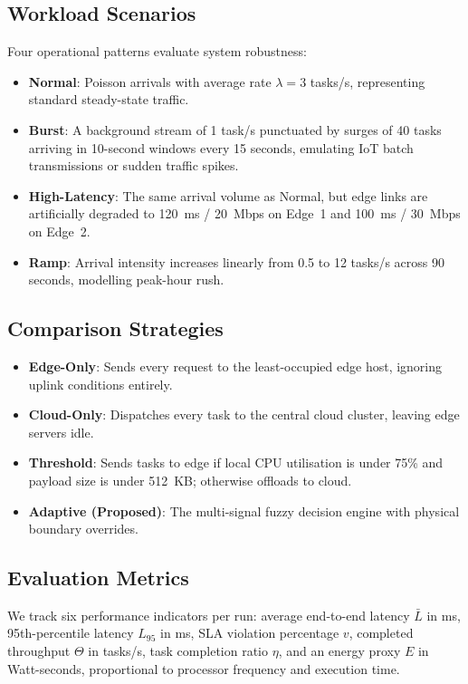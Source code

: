 \documentclass[conference]{IEEEtran}
\begin{document}
\subsection{Workload Scenarios}
Four operational patterns evaluate system robustness:
\begin{itemize}
  \item \textbf{Normal}: Poisson arrivals with average rate $\lambda = 3$ tasks/s, representing standard steady-state traffic.
  \item \textbf{Burst}: A background stream of 1 task/s punctuated by surges of 40 tasks arriving in 10-second windows every 15 seconds, emulating IoT batch transmissions or sudden traffic spikes.
  \item \textbf{High-Latency}: The same arrival volume as Normal, but edge links are artificially degraded to 120~ms / 20~Mbps on Edge~1 and 100~ms / 30~Mbps on Edge~2.
  \item \textbf{Ramp}: Arrival intensity increases linearly from 0.5 to 12 tasks/s across 90 seconds, modelling peak-hour rush.
\end{itemize}

\subsection{Comparison Strategies}
\begin{itemize}
  \item \textbf{Edge-Only}: Sends every request to the least-occupied edge host, ignoring uplink conditions entirely.
  \item \textbf{Cloud-Only}: Dispatches every task to the central cloud cluster, leaving edge servers idle.
  \item \textbf{Threshold}: Sends tasks to edge if local CPU utilisation is under 75\% and payload size is under 512~KB; otherwise offloads to cloud.
  \item \textbf{Adaptive (Proposed)}: The multi-signal fuzzy decision engine with physical boundary overrides.
\end{itemize}

\subsection{Evaluation Metrics}
We track six performance indicators per run: average end-to-end latency $\bar{L}$ in ms, 95th-percentile latency $L_{95}$ in ms, SLA violation percentage $v$, completed throughput $\Theta$ in tasks/s, task completion ratio $\eta$, and an energy proxy $E$ in Watt-seconds, proportional to processor frequency and execution time.
\end{document}
